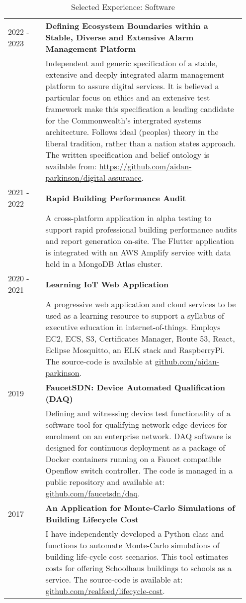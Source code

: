 \documentclass[11pt, oneside]{article}   	%
\begin{document}
\begin{table}[h]
\caption*{Selected Experience: Software}
\vspace{-5mm}
\small
\begin{center}
\begin{tabular}{p{0.15\linewidth} p{0.8\linewidth}}
\hline
2022 - 2023 &\textbf{Defining Ecosystem Boundaries within a Stable, Diverse and Extensive Alarm Management Platform} \\
&Independent and generic specification of a stable, extensive and deeply integrated alarm management platform to assure digital services.
It is believed a particular focus on ethics and an extensive test framework make this specification a leading candidate for the Commonwealth's intergrated systems architecture.
Follows ideal (peoples) theory in the liberal tradition, rather than a nation states approach.
The written specification and belief ontology is available from: \url{https://github.com/aidan-parkinson/digital-assurance}.\\
2021 - 2022 &\textbf{Rapid Building Performance Audit} \\
&A cross-platform application in alpha testing to support rapid professional building performance audits and report generation on-site. The Flutter application is integrated with an AWS Amplify service with data held in a MongoDB Atlas cluster. \\
2020 - 2021 &\textbf{Learning IoT Web Application} \\
&A progressive web application and cloud services to be used as a learning resource to support a syllabus of executive education in internet-of-things. Employs EC2, ECS, S3, Certificates Manager, Route 53, React, Eclipse Mosquitto, an ELK stack and RaspberryPi. The source-code is available at \url{github.com/aidan-parkinson}.\\
2019&\textbf{FaucetSDN: Device Automated Qualification (DAQ)} \\
&Defining and witnessing device test functionality of a software tool for qualifying network edge devices for enrolment on an enterprise network. DAQ software is designed for continuous deployment as a package of Docker containers running on a Faucet compatible Openflow switch controller. The code is managed in a public repository and available at: \url{github.com/faucetsdn/daq}. \\
2017&\textbf{An Application for Monte-Carlo Simulations of Building Lifecycle Cost} \\
&I have independently developed a Python class and functions to automate Monte-Carlo simulations of building life-cycle cost scenarios. This tool estimates costs for offering Schoolhaus buildings to schools as a service. The source-code is available at: \url{github.com/realfeed/lifecycle-cost}. \\

\end{tabular}
\end{center}
\end{table}
\end{document}
